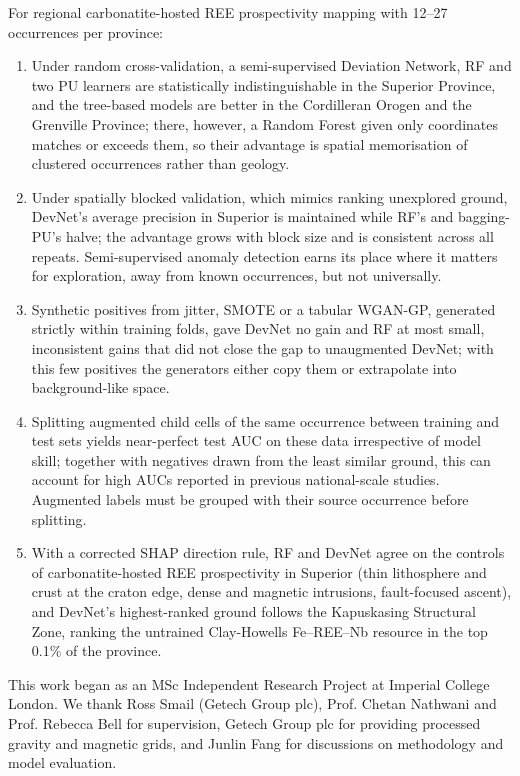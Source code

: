 \documentclass[pdflatex,sn-apa]{sn-jnl}
\begin{document}
For regional carbonatite-hosted REE prospectivity mapping with 12--27 occurrences per province:
\begin{enumerate}
\item Under random cross-validation, a semi-supervised Deviation Network, RF and two PU learners are statistically indistinguishable in the Superior Province, and the tree-based models are better in the Cordilleran Orogen and the Grenville Province; there, however, a Random Forest given only coordinates matches or exceeds them, so their advantage is spatial memorisation of clustered occurrences rather than geology.
\item Under spatially blocked validation, which mimics ranking unexplored ground, DevNet's average precision in Superior is maintained while RF's and bagging-PU's halve; the advantage grows with block size and is consistent across all repeats. Semi-supervised anomaly detection earns its place where it matters for exploration, away from known occurrences, but not universally.
\item Synthetic positives from jitter, SMOTE or a tabular WGAN-GP, generated strictly within training folds, gave DevNet no gain and RF at most small, inconsistent gains that did not close the gap to unaugmented DevNet; with this few positives the generators either copy them or extrapolate into background-like space.
\item Splitting augmented child cells of the same occurrence between training and test sets yields near-perfect test AUC on these data irrespective of model skill; together with negatives drawn from the least similar ground, this can account for high AUCs reported in previous national-scale studies. Augmented labels must be grouped with their source occurrence before splitting.
\item With a corrected SHAP direction rule, RF and DevNet agree on the controls of carbonatite-hosted REE prospectivity in Superior (thin lithosphere and crust at the craton edge, dense and magnetic intrusions, fault-focused ascent), and DevNet's highest-ranked ground follows the Kapuskasing Structural Zone, ranking the untrained Clay-Howells Fe--REE--Nb resource in the top 0.1\% of the province.
\end{enumerate}

\backmatter

This work began as an MSc Independent Research Project at Imperial College London. We thank Ross Smail (Getech Group plc), Prof. Chetan Nathwani and Prof. Rebecca Bell for supervision, Getech Group plc for providing processed gravity and magnetic grids, and Junlin Fang for discussions on methodology and model evaluation.
\end{document}
